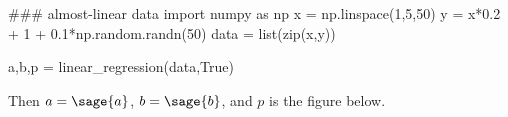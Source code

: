 \documentclass[SageableMath-2019SMath316.tex]{subfiles}
\begin{document}
\begin{sageblock}
### almost-linear data
import numpy as np
x = np.linspace(1,5,50)
y = x*0.2 + 1 + 0.1*np.random.randn(50)
data = list(zip(x,y))

a,b,p = linear_regression(data,True)
\end{sageblock}
Then $a=\sage{a}$, $b=\sage{b}$, and $p$ is the figure below.
\begin{center}  \end{center}
\end{document}
